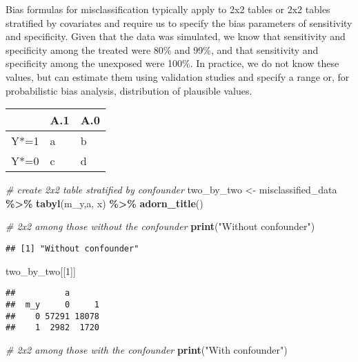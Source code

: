 \documentclass[
]{book}
\newenvironment{Shaded}{\begin{snugshade}}{\end{snugshade}}
\newcommand{\CommentTok}[1]{\textcolor[rgb]{0.56,0.35,0.01}{\textit{#1}}}
\newcommand{\DecValTok}[1]{\textcolor[rgb]{0.00,0.00,0.81}{#1}}
\newcommand{\FunctionTok}[1]{\textcolor[rgb]{0.13,0.29,0.53}{\textbf{#1}}}
\newcommand{\NormalTok}[1]{#1}
\newcommand{\OtherTok}[1]{\textcolor[rgb]{0.56,0.35,0.01}{#1}}
\newcommand{\SpecialCharTok}[1]{\textcolor[rgb]{0.81,0.36,0.00}{\textbf{#1}}}
\newcommand{\StringTok}[1]{\textcolor[rgb]{0.31,0.60,0.02}{#1}}
\begin{document}
Bias formulas for misclassification typically apply to 2x2 tables or 2x2 tables stratified by covariates and require us to specify the bias parameters of sensitivity and specificity. Given that the data was simulated, we know that sensitivity and specificity among the treated were 80\% and 99\%, and that sensitivity and specificity among the unexposed were 100\%. In practice, we do not know these values, but can estimate them using validation studies and specify a range or, for probabilistic bias analysis, distribution of plausible values.

\begin{tabular}{l|l|l}
\hline
  & A.1 & A.0\\
\hline
Y*=1 & a & b\\
\hline
Y*=0 & c & d\\
\hline
\end{tabular}

\begin{Shaded}
\begin{Highlighting}[]
\CommentTok{\# create 2x2 table stratified by confounder}
\NormalTok{two\_by\_two }\OtherTok{\textless{}{-}}\NormalTok{ misclassified\_data }\SpecialCharTok{\%\textgreater{}\%} \FunctionTok{tabyl}\NormalTok{(m\_y,a, x) }\SpecialCharTok{\%\textgreater{}\%} \FunctionTok{adorn\_title}\NormalTok{()}

\CommentTok{\# 2x2 among those without the confounder}
\FunctionTok{print}\NormalTok{(}\StringTok{"Without confounder"}\NormalTok{)}
\end{Highlighting}
\end{Shaded}

\begin{verbatim}
## [1] "Without confounder"
\end{verbatim}

\begin{Shaded}
\begin{Highlighting}[]
\NormalTok{two\_by\_two[[}\DecValTok{1}\NormalTok{]] }
\end{Highlighting}
\end{Shaded}

\begin{verbatim}
##          a      
##  m_y     0     1
##    0 57291 18078
##    1  2982  1720
\end{verbatim}

\begin{Shaded}
\begin{Highlighting}[]
\CommentTok{\# 2x2 among those with the confounder}
\FunctionTok{print}\NormalTok{(}\StringTok{"With confounder"}\NormalTok{)}
\end{Highlighting}
\end{Shaded}
\end{document}
